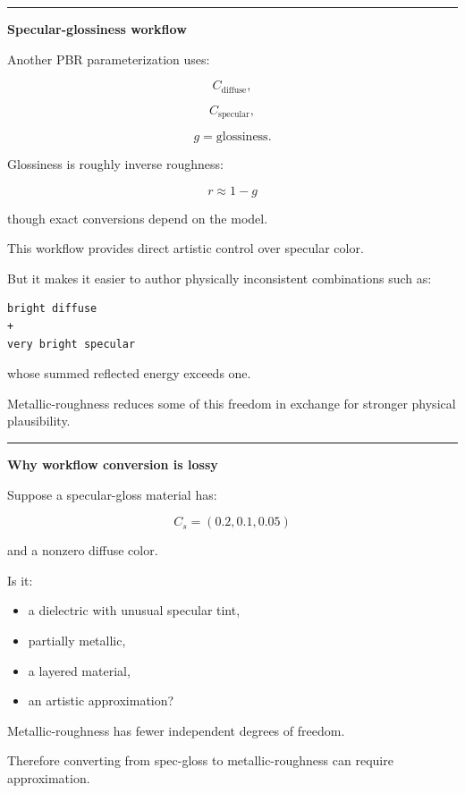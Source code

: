 \begin{center}\rule{0.5\linewidth}{0.5pt}\end{center}

\textbf{Specular-glossiness workflow}

Another PBR parameterization uses:

\[
C_{\text{diffuse}},
\]

\[
C_{\text{specular}},
\]

\[
g=\text{glossiness}.
\]

Glossiness is roughly inverse roughness:

\[
r\approx1-g
\]

though exact conversions depend on the model.

This workflow provides direct artistic control over specular color.

But it makes it easier to author physically inconsistent combinations such as:

\begin{verbatim}
bright diffuse
+
very bright specular
\end{verbatim}

whose summed reflected energy exceeds one.

Metallic-roughness reduces some of this freedom in exchange for stronger physical plausibility.

\begin{center}\rule{0.5\linewidth}{0.5pt}\end{center}

\textbf{Why workflow conversion is lossy}

Suppose a specular-gloss material has:

\[
C_s=(0.2,0.1,0.05)
\]

and a nonzero diffuse color.

Is it:

\begin{itemize}
\tightlist
\item
  a dielectric with unusual specular tint,
\item
  partially metallic,
\item
  a layered material,
\item
  an artistic approximation?
\end{itemize}

Metallic-roughness has fewer independent degrees of freedom.

Therefore converting from spec-gloss to metallic-roughness can require approximation.

